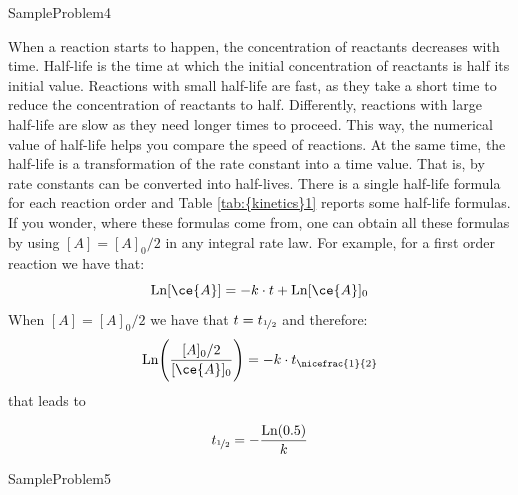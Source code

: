 \documentclass[main.tex]{subfiles}
\newcommand\chapterlabel{kinetics}
\begin{document}
\begin{description}
  {SampleProblem4}


\item[\docfilehook{Half-life, $t_{\nicefrac{1}{2}}$}{}] 
When a reaction starts to happen, the concentration of reactants decreases with time. Half-life is the time at which the initial concentration of reactants is half its initial value. Reactions with small half-life are fast, as they take a short time to reduce the concentration of reactants to half. Differently, reactions with large half-life are slow as they need longer times to proceed. This way, the numerical value of half-life helps you compare the speed of reactions. At the same time, the half-life is a transformation of the rate constant into a time value. That is, by rate constants can be converted into half-lives.
There is a single half-life formula for each reaction order and Table \ref{tab:{\chapterlabel}1} reports some half-life formulas. 
If you wonder, where these formulas come from, one can obtain all these formulas by using $[A]=[A]_0/2$ in any integral rate law. For example, for a first order reaction we have that:
\[\text{Ln}[\ce{A}]=-k\cdot t+\text{Ln}[\ce{A}]_0 \]
When $[A]=[A]_0/2$ we have that $t=t_{\nicefrac{1}{2}}$ and therefore:
\[\text{Ln}\Bigg(\frac{[A]_0/2}{[\ce{A}]_0}\Bigg)=-k\cdot t_{\nicefrac{1}{2}}\] that leads to

\[t_{\nicefrac{1}{2}}=-\frac{\text{Ln}(0.5)}{k} \]

\end{description}

  {SampleProblem5}
\end{document}
